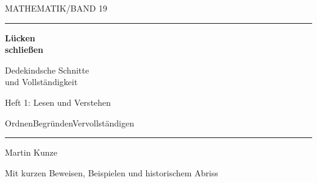 \documentclass[a4paper,10pt]{article}
\begin{document}
\hypertarget{cuts.reading}{}
{\sffamily\small MATHEMATIK\quad /\quad BAND 19}\par
\vspace{3mm}\hrule\vspace{9mm}
{\fontsize{29}{32}\selectfont\bfseries Lücken\\schließen\par}
\vspace{6mm}
{\Large Dedekindsche Schnitte\\und Vollständigkeit\par}
\vspace{3mm}
{\normalsize Heft 1: Lesen und Verstehen\par}
\vspace{16mm}
\begin{center}\CutsCoverFigure\end{center}
\vfill
{\sffamily\small Ordnen\quad\textbullet\quad Begründen\quad\textbullet\quad Vervollständigen\par}
\vspace{5mm}\hrule\vspace{3mm}
{\large Martin Kunze\par}
{\small Mit kurzen Beweisen, Beispielen und historischem Abriss\par}
\clearpage

\end{document}
